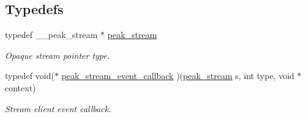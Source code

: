 \subsection*{Typedefs}
\begin{CompactItemize}
\item 
\hypertarget{group__stream_ga0}{
typedef \_\-\_\-peak\_\-stream $\ast$ \hyperlink{group__stream_ga0}{peak\_\-stream}}
\label{group__stream_ga0}

\begin{CompactList}\small\item\em Opaque stream pointer type. \item\end{CompactList}\item 
typedef void($\ast$ \hyperlink{group__stream_ga1}{peak\_\-stream\_\-event\_\-callback} )(\hyperlink{group__stream_ga0}{peak\_\-stream} s, int type, void $\ast$context)
\begin{CompactList}\small\item\em Stream client event callback. \item\end{CompactList}\end{CompactItemize}
